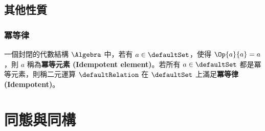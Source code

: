 \documentclass[utf8]{beamer}
\begin{document}
\begin{CJK}{UTF8}{bkai}
\subsection{其他性質}

\begin{frame}
	\frametitle{冪等律}
	\begin{mydef}[冪等元素與冪等律]
	\label{def:algebra:idempotent}
	一個封閉的代數結構 $\Algebra$ 中，若有 $a\in{\defaultSet}$，使得 $\Op{a}{a}=a$，則 $a$ 稱為\textbf{冪等元素 (Idempotent element)}。若所有 $a\in{\defaultSet}$ 都是冪等元素，則稱二元運算 $\defaultRelation$ 在 $\defaultSet$ 上滿足\textbf{冪等律 (Idempotent)}。
	\end{mydef}
\end{frame}

\section{同態與同構}



\end{CJK}
\end{document}
